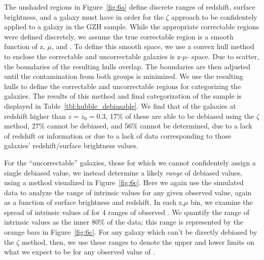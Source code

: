\documentclass[usenatbib]{mn2e}
\begin{document}
The unshaded regions in Figure~\ref{fig:6a} define discrete ranges of redshift, surface brightness, and \pfeatures{} a galaxy must have in order for the $\zeta$ approach to be confidentely applied to a galaxy in the GZH sample. While the appropriate correctable regions were defined discretely, we assume the true correctable region is a smooth function of z, $\mu$, and \pfeatures{}. To define this smooth space, we use a convex hull method to enclose the correctable and uncorrectable \ferengi{} galaxies is z-$\mu$-\pfeatures{} space. Due to scatter, the boundaries of the resulting hulls overlap. The boundaries are then adjusted until the contamination from both groups is minimized. We use the resulting hulls to define the correctable and uncorrectable regions for categorizing the \hst{} galaxies. The results of this method and final categorization of the \hst{} sample is displayed in Table~\ref{tbl:hubble_debiasable}. We find that of the galaxies at redshift higher than $z=z_{0}=0.3$, 17\% of these are able to be debiased using the $\zeta$ method, 27\% cannot be debiased, and 56\% cannot be determined, due to a lack of redshift or information or due to a lack of \ferengi{} data corresponding to those galaxies' redshift/surface brightness values.

For the ``uncorrectable'' galaxies, those for which we cannot confidentely assign a single debiased \pfeatures{} value, we instead determine a likely \emph{range} of debiased values, using a method visualized in Figure~\ref{fig:6c}. Here we again use the \ferengi{} simulated data to analyze the range of intrinsic \pfeaturesrest{} values for any given observed \pfeatures{} value, again as a function of surface brightness and redshift. In each z,$\mu$ bin, we examine the spread of intrinsic values of \pfeaturesrest{} for 4 ranges of observed \pfeatures. We quantify the range of intrinsic values as the inner 80\% of the data; this range is represented by the orange bars in Figure~\ref{fig:6c}. For any galaxy which can't be directly debiased by the $\zeta$ method, then, we use these ranges to denote the upper and lower limits on what we expect \pfeaturesrest{} to be for any observed value of \pfeatures. 
\end{document}
